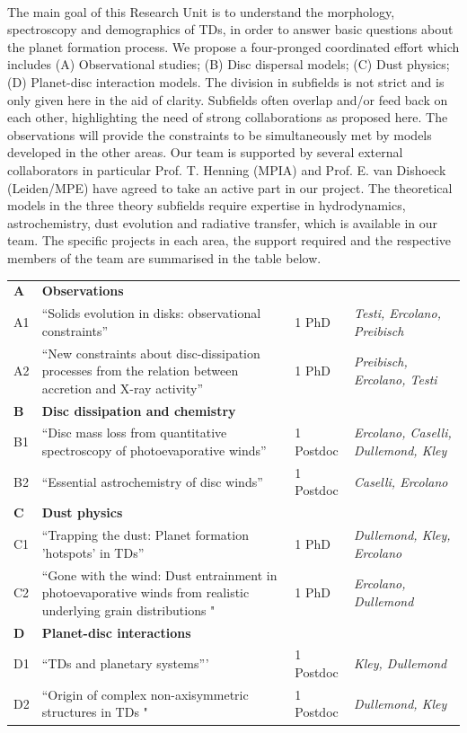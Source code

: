 \documentclass[12pt]{article}
\begin{document}
\vspace{0.8em}\\
%
The main goal of this Research Unit is to understand the morphology,
spectroscopy and demographics of TDs, in order to answer
basic questions about the planet formation process. We propose a
four-pronged coordinated effort which includes (A) Observational
studies; (B) Disc dispersal models; (C) Dust physics; (D) Planet-disc
interaction models. The division in subfields is not strict and is
only given here in the aid of clarity. Subfields often overlap and/or
feed back on each other, highlighting the need of strong
collaborations as proposed here. The observations will provide the
constraints to be simultaneously met by models developed in the other
areas. Our team is supported by several external collaborators in particular
Prof. T. Henning (MPIA) and Prof. E. van Dishoeck (Leiden/MPE) have
agreed to take an active part in our project. The theoretical models in the three theory subfields require
expertise in hydrodynamics, astrochemistry, dust evolution and
radiative transfer, which is available in our team. The specific
projects in each area, the support required and the respective members
of the team are summarised in the table below. 
\vspace{1.5em}

\noindent
\begin{tabular}{p{1cm}p{8cm}p{2.0cm}p{3.9cm}}
\hline
{\bf A} & {\bf Observations} & & \\ 
A1 & ``Solids evolution in disks: observational constraints'' & 1 PhD & {\em Testi, Ercolano, Preibisch}\\
A2 & ``New constraints about disc-dissipation processes from the relation between accretion and X-ray activity'' & 1 PhD & {\em Preibisch, Ercolano, Testi}\\
\hline
{\bf B} & {\bf Disc dissipation and chemistry} & & \\ 
B1 & ``Disc mass loss from quantitative spectroscopy of
photoevaporative winds'' & 1 Postdoc & {\em Ercolano, Caselli, Dullemond, Kley}\\
B2 & ``Essential astrochemistry of disc winds'' & 1 Postdoc & {\em Caselli, Ercolano}\\
\hline
{\bf C} & {\bf Dust physics} & & \\ 
C1 & ``Trapping the dust: Planet formation 'hotspots' in TDs'' & 1 PhD & {\em Dullemond, Kley, Ercolano}\\
C2 & ``Gone with the wind: Dust entrainment in photoevaporative winds from realistic underlying grain distributions "& 1 PhD & {\em Ercolano, Dullemond}\\
\hline
{\bf D} & {\bf Planet-disc interactions} & & \\ 
D1 & ``TDs and planetary systems''' & 1 Postdoc & {\em Kley, Dullemond}\\
D2 & ``Origin of complex non-axisymmetric structures in TDs "& 1 Postdoc & {\em Dullemond, Kley}\\
\hline
\end{tabular}
\vspace{1.5em}
\end{document}
